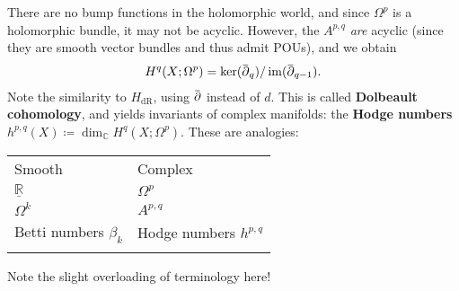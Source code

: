\begin{remark}

There are no bump functions in the holomorphic world, and since
\(\Omega^p\) is a holomorphic bundle, it may not be acyclic. However,
the \(A^{p, q}\) \emph{are} acyclic (since they are smooth vector
bundles and thus admit POUs), and we obtain
\begin{align*}
H^q(X; \Omega^p) = \ker( \mkern 1.5mu\overline{\mkern-1.5mu{\partial}\mkern-1.5mu}\mkern 1.5mu_q) / \operatorname{im}(\mkern 1.5mu\overline{\mkern-1.5mu{\partial}\mkern-1.5mu}\mkern 1.5mu_{q-1})
.\end{align*}
Note the similarity to \(H_{\mathrm{dR}}\), using
\(\mkern 1.5mu\overline{\mkern-1.5mu{\partial}\mkern-1.5mu}\mkern 1.5mu\)
instead of \(d\). This is called \textbf{Dolbeault cohomology}, and
yields invariants of complex manifolds: the \textbf{Hodge numbers}
\(h^{p, q}(X) \coloneqq\dim_{\mathbb{C}}H^q(X; \Omega^p)\). These are
analogies:

\begin{longtable}[]{@{}ll@{}}
\toprule
Smooth & Complex \\ \addlinespace
\midrule
\endhead
\(\underline{{\mathbb{R}}}\) & \(\Omega^p\) \\ \addlinespace
\(\Omega^k\) & \(A^{p, q}\) \\ \addlinespace
Betti numbers \(\beta_k\) & Hodge numbers \(h^{p, q}\) \\ \addlinespace
\bottomrule
\end{longtable}

Note the slight overloading of terminology here!

\end{remark}

